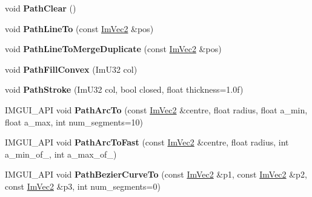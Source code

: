 \begin{DoxyCompactItemize}
\item 
\mbox{\label{struct_im_draw_list_ae9ad5f4d638b1bfd9383618dc60e3f18}} 
void {\bfseries Path\+Clear} ()
\item 
\mbox{\label{struct_im_draw_list_a828d944325ed58d8b57abd3647bffaaf}} 
void {\bfseries Path\+Line\+To} (const \hyperlink{struct_im_vec2}{Im\+Vec2} \&pos)
\item 
\mbox{\label{struct_im_draw_list_aa3dd11945fb62495f8b9e1392ed724e3}} 
void {\bfseries Path\+Line\+To\+Merge\+Duplicate} (const \hyperlink{struct_im_vec2}{Im\+Vec2} \&pos)
\item 
\mbox{\label{struct_im_draw_list_aea9301cb99ebf4b27f5d3959017567c9}} 
void {\bfseries Path\+Fill\+Convex} (Im\+U32 col)
\item 
\mbox{\label{struct_im_draw_list_ac3172e376a4b77915bb22b6d8092b8b2}} 
void {\bfseries Path\+Stroke} (Im\+U32 col, bool closed, float thickness=1.\+0f)
\item 
\mbox{\label{struct_im_draw_list_acb69ef7febcc54c9e5e09d2460c85b61}} 
I\+M\+G\+U\+I\+\_\+\+A\+PI void {\bfseries Path\+Arc\+To} (const \hyperlink{struct_im_vec2}{Im\+Vec2} \&centre, float radius, float a\+\_\+min, float a\+\_\+max, int num\+\_\+segments=10)
\item 
\mbox{\label{struct_im_draw_list_a713cca3862e88aa1ee671db1c4cf6bdb}} 
I\+M\+G\+U\+I\+\_\+\+A\+PI void {\bfseries Path\+Arc\+To\+Fast} (const \hyperlink{struct_im_vec2}{Im\+Vec2} \&centre, float radius, int a\+\_\+min\+\_\+of\+\_, int a\+\_\+max\+\_\+of\+\_)
\item 
\mbox{\label{struct_im_draw_list_a495ca7dd4fd5a898e2414658321f4b18}} 
I\+M\+G\+U\+I\+\_\+\+A\+PI void {\bfseries Path\+Bezier\+Curve\+To} (const \hyperlink{struct_im_vec2}{Im\+Vec2} \&p1, const \hyperlink{struct_im_vec2}{Im\+Vec2} \&p2, const \hyperlink{struct_im_vec2}{Im\+Vec2} \&p3, int num\+\_\+segments=0)
\item 
\mbox{\label{struct_im_draw_list_a1b63e7c7bbb70f8a7be2b227a3d3f802}} 

\end{DoxyCompactItemize}
